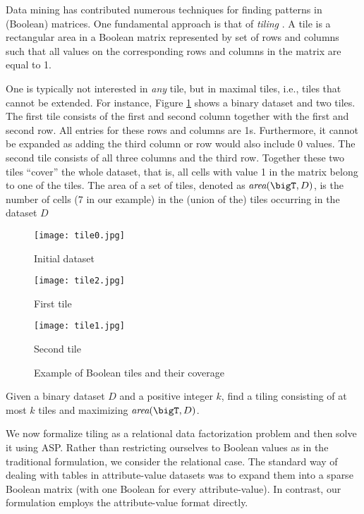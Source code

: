 Data mining has contributed numerous techniques for finding patterns in (Boolean) matrices. One fundamental approach is that of \emph{tiling} \parencite{tiling}.  A tile is a rectangular area in a Boolean matrix represented by set of rows and columns such that all values on the corresponding rows and columns in the matrix are equal to 1.  

One is typically not interested in {\em any} tile, but in maximal tiles, i.e., tiles that cannot be extended.  For instance, Figure \ref{tilesExample} shows a binary dataset and two tiles. The first tile consists of the first and second column together with the first and second row. All entries for these rows and columns are 1s. 
Furthermore, it cannot be expanded as adding the third column or row would also include 0 values. The second tile
consists of all three columns and the third row. 
Together these two tiles ``cover'' the whole dataset, that is, all cells with value 1 in the matrix belong to one of the tiles. The area of a set of tiles, denoted as $\textit{area}(\bigT, D)$, is the number of cells (7 in our example) in the (union of the) tiles \bigT occurring in the dataset $D$ 
\begin{figure}[tbh]
  \centering
  \centering
  \texttt{[image: tile0.jpg]}
  \caption*{Initial dataset}
  \endminipage
  \centering
  \texttt{[image: tile2.jpg]}
  \caption*{First tile}
  \endminipage
  \centering
  \texttt{[image: tile1.jpg]}
  \caption*{Second tile}
  \endminipage
  \caption{Example of Boolean tiles and their coverage}
  \label{tilesExample}
\end{figure}



\begin{definition}
Given a binary dataset $D$ and a positive integer $k$, find a tiling \bigT consisting of at most $k$ tiles and maximizing $\textit{area}(\bigT, D)$.
\end{definition}

We now formalize tiling as a relational data factorization problem and then solve it using ASP. Rather than restricting ourselves to Boolean values as in the traditional formulation, we consider the relational case. The standard way of dealing with tables in attribute-value datasets was to expand them into a sparse Boolean matrix (with one Boolean for every attribute-value). In contrast, our formulation employs the attribute-value format directly. 

